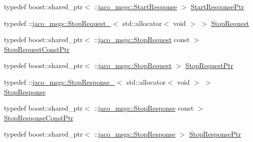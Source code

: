 \begin{DoxyCompactItemize}
\item 
typedef boost\+::shared\+\_\+ptr$<$ \+::\hyperlink{namespacejaco__msgs_ab90a2d56175265d26907e49c8a56088d}{jaco\+\_\+msgs\+::\+Start\+Response} $>$ \hyperlink{namespacejaco__msgs_a97c77302104b44b1a8b7273e4b2e40f2}{Start\+Response\+Ptr}
\item 
typedef \+::\hyperlink{structjaco__msgs_1_1StopRequest__}{jaco\+\_\+msgs\+::\+Stop\+Request\+\_\+}$<$ std\+::allocator$<$ void $>$ $>$ \hyperlink{namespacejaco__msgs_a7f71a39d70d57c48cf1d0e67cb41d127}{Stop\+Request}
\item 
typedef boost\+::shared\+\_\+ptr$<$ \+::\hyperlink{namespacejaco__msgs_a7f71a39d70d57c48cf1d0e67cb41d127}{jaco\+\_\+msgs\+::\+Stop\+Request} const  $>$ \hyperlink{namespacejaco__msgs_ada14f57e263986dea014af1f67460020}{Stop\+Request\+Const\+Ptr}
\item 
typedef boost\+::shared\+\_\+ptr$<$ \+::\hyperlink{namespacejaco__msgs_a7f71a39d70d57c48cf1d0e67cb41d127}{jaco\+\_\+msgs\+::\+Stop\+Request} $>$ \hyperlink{namespacejaco__msgs_aff2b98dafc6a922e9b7efac2f31dd988}{Stop\+Request\+Ptr}
\item 
typedef \+::\hyperlink{structjaco__msgs_1_1StopResponse__}{jaco\+\_\+msgs\+::\+Stop\+Response\+\_\+}$<$ std\+::allocator$<$ void $>$ $>$ \hyperlink{namespacejaco__msgs_a2694506badd782d8dc5474717333e374}{Stop\+Response}
\item 
typedef boost\+::shared\+\_\+ptr$<$ \+::\hyperlink{namespacejaco__msgs_a2694506badd782d8dc5474717333e374}{jaco\+\_\+msgs\+::\+Stop\+Response} const  $>$ \hyperlink{namespacejaco__msgs_a95d47cf915aaabdcee3a84ee1d2fe8a1}{Stop\+Response\+Const\+Ptr}
\item 
typedef boost\+::shared\+\_\+ptr$<$ \+::\hyperlink{namespacejaco__msgs_a2694506badd782d8dc5474717333e374}{jaco\+\_\+msgs\+::\+Stop\+Response} $>$ \hyperlink{namespacejaco__msgs_a36270be30c41e63565c9a1618e362f05}{Stop\+Response\+Ptr}
\end{DoxyCompactItemize}
